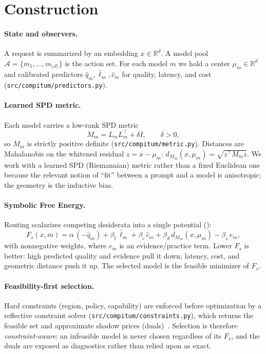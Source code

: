 \documentclass[11pt]{article}
\theoremstyle{plain}
\theoremstyle{definition}
\theoremstyle{remark}
\newcommand{\Fs}{F_{s}}
\newcommand{\R}{\mathbb{R}}
\newcommand{\code}[1]{\texttt{#1}}
\newcommand{\filepath}[1]{{\urlstyle{tt}\path{#1}}}
\begin{document}
\section{Construction}\label{sec:construction}

\paragraph{State and observers.} A request is summarized by an embedding $x\in\R^{d}$.
A model pool $\mathcal{A}=\{m_1,\dots,m_{|\mathcal{A}|}\}$ is the action set. For each
model $m$ we hold a center $\mu_m\in\R^{d}$ and calibrated predictors
$\hat q_m,\hat\ell_m,\hat c_m$ for quality, latency, and cost
(\code{src/compitum/predictors.py}).

\paragraph{Learned SPD metric.} Each model carries a low-rank SPD metric
\begin{equation}
M_m = L_m L_m^{\top} + \delta I,\qquad \delta>0,
\end{equation}
so $M_m$ is strictly positive definite (\code{src/compitum/metric.py}). Distances are
Mahalanobis on the whitened residual $z = x-\mu_m$:
$d_{M_m}(x,\mu_m) = \sqrt{z^{\top}M_m z}$. We work with a learned SPD (Riemannian)
metric rather than a fixed Euclidean one because the relevant notion of ``fit'' between a
prompt and a model is anisotropic; the geometry is the inductive bias.

\paragraph{Symbolic Free Energy.} Routing scalarizes competing desiderata into a single
potential (\filepath{src/compitum/energy.py}):
\begin{equation}\label{eq:Fs}
\Fs(x,m) = \alpha\,(-\hat q_m) + \beta_t\,\hat\ell_m + \beta_c\,\hat c_m
        + \beta_d\, d_{M_m}(x,\mu_m) - \beta_s\, e_m,
\end{equation}
with nonnegative weights, where $e_m$ is an evidence/practice term. Lower $\Fs$ is better:
high predicted quality and evidence pull it down; latency, cost, and geometric distance push
it up. The selected model is the feasible minimizer of $\Fs$.

\paragraph{Feasibility-first selection.} Hard constraints (region, policy, capability) are
enforced before optimization by a reflective constraint solver
(\code{src/compitum/constraints.py}), which returns the feasible set and approximate
shadow prices (duals)~\cite{boyd_cvx}. Selection is therefore \emph{constraint-aware}: an infeasible model
is never chosen regardless of its $\Fs$, and the duals are exposed as diagnostics rather
than relied upon as exact.
\end{document}
